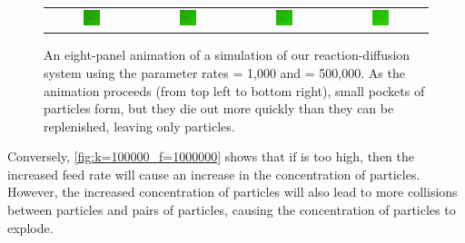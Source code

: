 \begin{figure}[h]
\begin{tabular}{c c c c}
\includegraphics[width = 0.19\textwidth]{../images_CMYK/predator_prey_predator_dies_f1e1_r5e5_i4} & \includegraphics[width = 0.19\textwidth]{../images_CMYK/../images_CMYK/predator_prey_predator_dies_f1e1_r5e5_i5} & \includegraphics[width = 0.19\textwidth]{../images_CMYK/../images_CMYK/predator_prey_predator_dies_f1e1_r5e5_i6} & \includegraphics[width = 0.19\textwidth]{../images_CMYK/../images_CMYK/predator_prey_predator_dies_f1e1_r5e5_i7}
\end{tabular}
\caption{An eight-panel animation of a simulation of our reaction-diffusion system using the parameter rates  = 1,000 and  = 500,000. As the animation proceeds (from top left to bottom right), small pockets of  particles form, but they die out more quickly than they can be replenished, leaving only  particles.}
\label{fig:k=500000_f=1000}
\end{figure}

Conversely, \autoref{fig:k=100000_f=1000000} shows that if  is too high, then the increased feed rate will cause an increase in the concentration of  particles. However, the increased concentration of  particles will also lead to more collisions between  particles and pairs of  particles, causing the concentration of  particles to explode.\\

